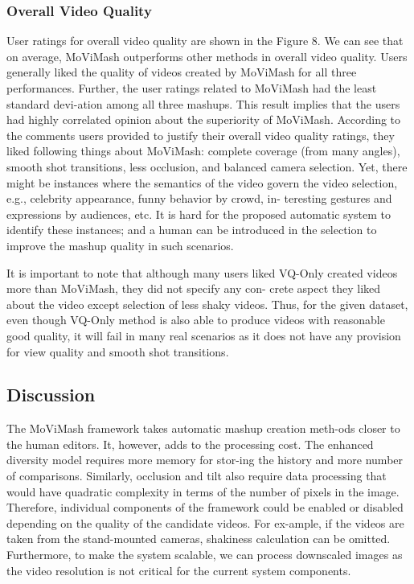 \documentclass{sig-alternate}
\begin{document}
\subsubsection{Overall Video Quality}
User ratings for overall video quality are shown in the Figure 8.
We can see that on average, MoViMash outperforms other methods in overall video quality. Users generally liked the quality of
videos created by MoViMash for all three performances. Further,
the user ratings related to MoViMash had the least standard devi-ation among all three mashups. This result implies that the users
had highly correlated opinion about the superiority of MoViMash.
According to the comments users provided to justify their overall
video quality ratings, they liked following things about MoViMash:
complete coverage (from many angles), smooth shot transitions,
less occlusion, and balanced camera selection. Yet, there might
be instances where the semantics of the video govern the video
selection, e.g., celebrity appearance, funny behavior by crowd, in-
teresting gestures and expressions by audiences, etc. It is hard for
the proposed automatic system to identify these instances; and a
human can be introduced in the selection to improve the mashup
quality in such scenarios.


It is important to note that although many users liked VQ-Only
created videos more than MoViMash, they did not specify any con-
crete aspect they liked about the video except selection of less
shaky videos. Thus, for the given dataset, even though VQ-Only
method is also able to produce videos with reasonable good quality,
it will fail in many real scenarios as it does not have any provision
for view quality and smooth shot transitions.

\subsection{Discussion}
The MoViMash framework takes automatic mashup creation meth-ods closer to the human editors. It, however, adds to the processing
cost. The enhanced diversity model requires more memory for stor-ing the history and more number of comparisons. Similarly, occlusion and tilt also require data processing that would have quadratic
complexity in terms of the number of pixels in the image. Therefore, individual components of the framework could be enabled or
disabled depending on the quality of the candidate videos. For ex-ample, if the videos are taken from the stand-mounted cameras,
shakiness calculation can be omitted. Furthermore, to make the
system scalable, we can process downscaled images as the video
resolution is not critical for the current system components.
\end{document}
